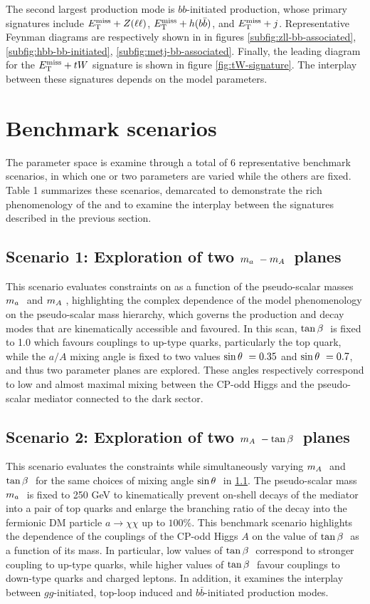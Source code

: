 The second largest production mode is $bb$-initiated production, whose primary signatures include $E_{\mathrm{T}}^{\mathrm{miss}}+Z(\ell\ell)$, $E_{\mathrm{T}}^{\mathrm{miss}}+h(b\bar{b})$, and $E_{\mathrm{T}}^{\mathrm{miss}}+j$. Representative Feynman diagrams are respectively shown in in figures \ref{subfig:zll-bb-associated}, \ref{subfig:hbb-bb-initiated}, \ref{subfig:metj-bb-associated}. Finally, the leading diagram for the $E_{\mathrm{T}}^{\mathrm{miss}}+tW$ signature is shown in figure \ref{fig:tW-signature}. The interplay between these signatures depends on the \thdma model parameters. 

\section{Benchmark scenarios}
\label{sect:benchmark-scenarios}
The parameter space is examine through a total of 6 representative benchmark scenarios, in which one or two parameters are varied while the others are fixed. 
Table 1 summarizes these scenarios, demarcated to demonstrate the rich phenomenology of the \thdma and to examine the interplay between the signatures described in the previous section.

\subsection{Scenario 1: Exploration of two \texorpdfstring{$m_a~-m_A~$}{TEXT} planes}\label{subsection:ma-mA-scan}
This scenario evaluates constraints on \thdma as a function of the pseudo-scalar masses $m_a~$ and $m_A~$, highlighting the complex dependence of the model phenomenology on the pseudo-scalar mass hierarchy, which governs the production and decay modes that are kinematically accessible and favoured. 
In this scan, $\tan\beta~$ is fixed to 1.0 which favours couplings to up-type quarks, particularly the top quark, while the $a/A$ mixing angle is fixed to two values $\sin\theta~=0.35$ and $\sin\theta~=0.7$, and thus two parameter planes are explored. 
These angles respectively correspond to low and almost maximal mixing between the CP-odd Higgs and the pseudo-scalar mediator connected to the dark sector.

\subsection{Scenario 2: Exploration of two \texorpdfstring{$m_A~-\tan\beta~$}{TEXT} planes}\label{subsection:mA-tanb-scan}

This scenario evaluates the constraints while simultaneously varying $m_A~$ and $\tan\beta~$ for the same choices of mixing angle $\sin\theta~$ in \ref{subsection:ma-mA-scan}. The pseudo-scalar mass $m_a~$ is fixed to 250 GeV to kinematically prevent on-shell decays of the mediator into a pair of top quarks and enlarge the branching ratio of the decay into the fermionic DM particle $a\rightarrow \chi\chi$ up to $100\%$. This benchmark scenario highlights the dependence of the couplings of the CP-odd Higgs $A$ on the value of $\tan\beta~$ as a function of its mass. In particular, low values of $\tan\beta~$ correspond to stronger coupling to up-type quarks, while higher values of $\tan\beta~$ favour couplings to down-type quarks and charged leptons. In addition, it examines the interplay between $gg$-initiated, top-loop induced and $b\bar{b}$-initiated production modes. 

